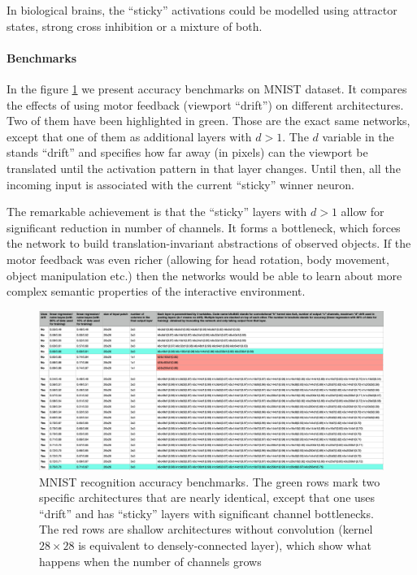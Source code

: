 \documentclass[12pt]{article}
\begin{document}
In biological brains,  the ``sticky'' activations could be modelled using attractor states, strong cross inhibition or a mixture of both.
 

\paragraph{Benchmarks} In the figure \ref{fig:benchmarks} we present accuracy benchmarks on MNIST dataset. It compares the effects of using  motor feedback (viewport ``drift'') on different architectures. Two of them have been highlighted in green. Those are the exact same networks, except that one of them as additional layers with $d>1$. The $d$ variable in the stands ``drift'' and specifies how far away (in pixels) can the viewport be translated until the activation pattern in that layer changes. Until then, all the incoming input is associated with the current ``sticky'' winner neuron. 

The remarkable achievement is that the ``sticky'' layers with $d>1$ allow for significant reduction in number of channels. It forms a bottleneck, which forces the network to build translation-invariant abstractions of observed objects. If the motor feedback was even richer (allowing for head rotation, body movement, object manipulation etc.) then the networks would be able to learn about more complex semantic properties of the interactive environment.


\begin{figure}[!htbp]
	\centering
	\includegraphics[width=13.8cm]{benchmarks}
	\caption{MNIST recognition accuracy benchmarks. The green rows mark two specific architectures that are nearly identical, except that one uses ``drift'' and has ``sticky'' layers with significant channel bottlenecks.  The red rows are shallow architectures without convolution (kernel $28\times28$ is equivalent to densely-connected layer), which show what happens when the number of channels grows}
	\label{fig:benchmarks}
\end{figure} 
\end{document}
